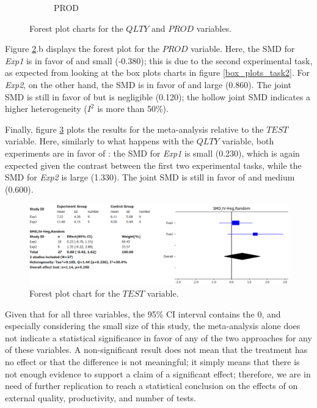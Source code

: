 \begin{figure}[H]
\begin{subfigure}{0.5\textwidth}
        \caption{PROD}
        \label{fp_prod}
    \end{subfigure}
    \caption{Forest plot charts for the $QLTY$ and $PROD$ variables.}
    \label{fp_qlty_prod}
\end{figure}

Figure \ref{fp_qlty_prod}.b displays the forest plot for the $PROD$ variable. Here, the SMD for \textit{Exp1} is in favor of \notdd and small (-0.380); this is due to the second experimental task, as expected from looking at the box plots charts in figure \ref{box_plots_task2}. For \textit{Exp2}, on the other hand, the SMD is in favor of \tdd and large (0.860). The joint SMD is still in favor of \tdd but is negligible (0.120); the hollow joint SMD indicates a higher heterogeneity ($I^2$ is more than 50\%).

Finally, figure \ref{fp_test} plots the results for the meta-analysis relative to the $TEST$ variable. Here, similarly to what happens with the $QLTY$ variable, both experiments are in favor of \tdd: the SMD for \textit{Exp1} is small (0.230), which is again expected given the contrast between the first two experimental tasks, while the SMD for \textit{Exp2} is large (1.330). The joint SMD is still in favor of \tdd and medium (0.600).

\begin{figure}[H]
    \includegraphics[width=\linewidth]{figures/forest_plots/TEST.png}
    \caption{Forest plot chart for the $TEST$ variable.}
    \label{fp_test}
\end{figure}\hfil
    
Given that for all three variables, the 95\% CI interval contains the 0, and especially considering the small size of this study, the meta-analysis alone does not indicate a statistical significance in favor of any of the two approaches for any of these variables.
A non-significant result does not mean that the treatment has no effect or that the difference is not meaningful; it simply means that there is not enough evidence to support a claim of a significant effect; therefore, we are in need of further replication to reach a statistical conclusion on the effects of \tdd on external quality, productivity, and number of tests.



